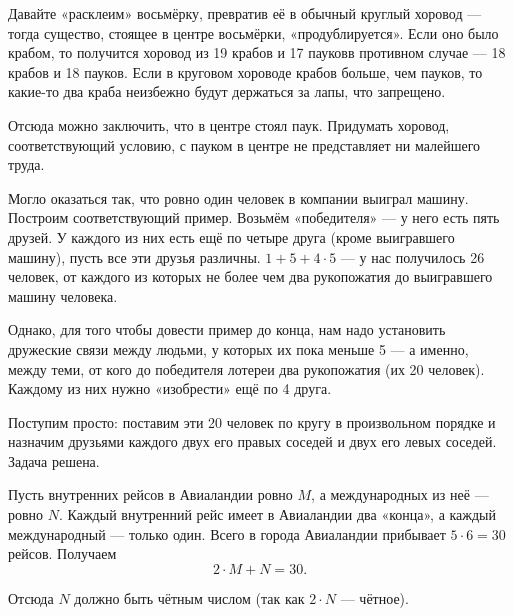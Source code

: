 \begin{itemize}
\itA Давайте «расклеим» восьмёрку, превратив её в обычный круглый хоровод — тогда существо, стоящее в центре восьмёрки, «продублируется». Если оно было крабом, то получится хоровод из 19 крабов и 17 пауков\scolon в противном случае — 18 крабов и 18 пауков. Если в круговом хороводе крабов больше, чем пауков, то какие-то два краба неизбежно будут держаться за лапы, что запрещено.

\ms Отсюда можно заключить, что в центре стоял паук. Придумать хоровод, соответствующий условию, с пауком в центре не представляет ни малейшего труда.

\itB Могло оказаться так, что ровно один человек в компании выиграл машину. Построим соответствующий пример. Возьмём «победителя» — у него есть пять друзей. У каждого из них есть ещё по четыре друга (кроме выигравшего машину), пусть все эти друзья различны. $1+5+4 \cdot 5$ — у нас получилось 26 человек, от каждого из которых не более чем два рукопожатия до выигравшего машину человека.

\ms Однако, для того чтобы довести пример до конца, нам надо установить дружеские связи между людьми, у которых их пока меньше 5 — а именно, между теми, от кого до победителя лотереи два рукопожатия (их 20 человек). Каждому из них нужно «изобрести» ещё по 4 друга.

\ms Поступим просто: поставим эти 20 человек по кругу в произвольном порядке и назначим друзьями каждого двух его правых соседей и двух его левых соседей. Задача решена.

\itC Пусть внутренних рейсов в Авиаландии ровно $M$, а международных из неё — ровно $N$. Каждый внутренний рейс имеет в Авиаландии два «конца», а каждый международный — только один. Всего в города Авиаландии прибывает $5 \cdot 6 = 30$ рейсов. Получаем
	$$2 \cdot M + N = 30.$$

Отсюда $N$ должно быть чётным числом (так как $2 \cdot N$ — чётное).
\end{itemize}
